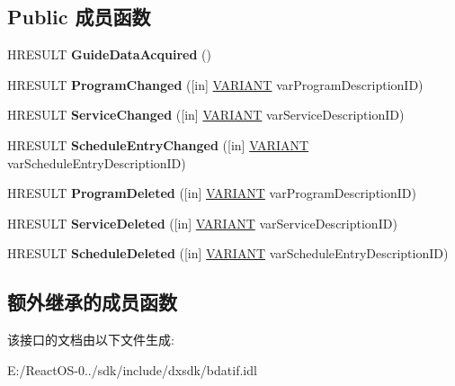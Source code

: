 \subsection*{Public 成员函数}
\begin{DoxyCompactItemize}
\item 
\mbox{\label{interface_i_guide_data_event_a329d5d9f803df671d03bf86c0c0c32ac}} 
H\+R\+E\+S\+U\+LT {\bfseries Guide\+Data\+Acquired} ()
\item 
\mbox{\label{interface_i_guide_data_event_a081cf9dbec916e70f720b6042c0f5eeb}} 
H\+R\+E\+S\+U\+LT {\bfseries Program\+Changed} (\mbox{[}in\mbox{]} \hyperlink{structtag_v_a_r_i_a_n_t}{V\+A\+R\+I\+A\+NT} var\+Program\+Description\+ID)
\item 
\mbox{\label{interface_i_guide_data_event_a24afaea6205d6f860b523487f385311e}} 
H\+R\+E\+S\+U\+LT {\bfseries Service\+Changed} (\mbox{[}in\mbox{]} \hyperlink{structtag_v_a_r_i_a_n_t}{V\+A\+R\+I\+A\+NT} var\+Service\+Description\+ID)
\item 
\mbox{\label{interface_i_guide_data_event_a7adf76ad510c737c37cf539a02003ec5}} 
H\+R\+E\+S\+U\+LT {\bfseries Schedule\+Entry\+Changed} (\mbox{[}in\mbox{]} \hyperlink{structtag_v_a_r_i_a_n_t}{V\+A\+R\+I\+A\+NT} var\+Schedule\+Entry\+Description\+ID)
\item 
\mbox{\label{interface_i_guide_data_event_a276bac5ea8ed0277e05f6e6621e13e01}} 
H\+R\+E\+S\+U\+LT {\bfseries Program\+Deleted} (\mbox{[}in\mbox{]} \hyperlink{structtag_v_a_r_i_a_n_t}{V\+A\+R\+I\+A\+NT} var\+Program\+Description\+ID)
\item 
\mbox{\label{interface_i_guide_data_event_abcca35b650db1c98a497d4c06bfee7bf}} 
H\+R\+E\+S\+U\+LT {\bfseries Service\+Deleted} (\mbox{[}in\mbox{]} \hyperlink{structtag_v_a_r_i_a_n_t}{V\+A\+R\+I\+A\+NT} var\+Service\+Description\+ID)
\item 
\mbox{\label{interface_i_guide_data_event_ae633fcd7c6d909a28c07ad52159eff8b}} 
H\+R\+E\+S\+U\+LT {\bfseries Schedule\+Deleted} (\mbox{[}in\mbox{]} \hyperlink{structtag_v_a_r_i_a_n_t}{V\+A\+R\+I\+A\+NT} var\+Schedule\+Entry\+Description\+ID)
\end{DoxyCompactItemize}
\subsection*{额外继承的成员函数}


该接口的文档由以下文件生成\+:\begin{DoxyCompactItemize}
\item 
E\+:/\+React\+O\+S-\/0../sdk/include/dxsdk/bdatif.\+idl\end{DoxyCompactItemize}
